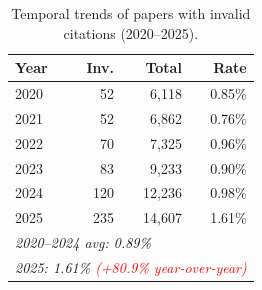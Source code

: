 \begin{table}[t]
  \centering
  \begin{threeparttable}
    \caption{Temporal trends of papers with invalid citations (2020--2025).}
    \label{tab:temporal_trends}
    \small
{}
\begin{tabular}{lrrr}
\toprule
\textbf{Year} & \textbf{Inv.} & \textbf{Total} & \textbf{Rate} \\
\midrule
2020 & 52 & 6,118 & 0.85\% \\
2021 & 52 & 6,862 & 0.76\% \\
2022 & 70 & 7,325 & 0.96\% \\
2023 & 83 & 9,233 & 0.90\% \\
2024 & 120 & 12,236 & 0.98\% \\
\cellcolor{red!25}2025 & \cellcolor{red!25}235 & \cellcolor{red!25}14,607 & \cellcolor{red!25}1.61\% \\
\midrule
\multicolumn{4}{l}{\textit{2020--2024 avg: 0.89\%}} \\
\multicolumn{4}{l}{\textit{2025: 1.61\% \textcolor{red}{(+80.9\% year-over-year)}}} \\
\bottomrule
\end{tabular}
  \end{threeparttable}
\end{table}

